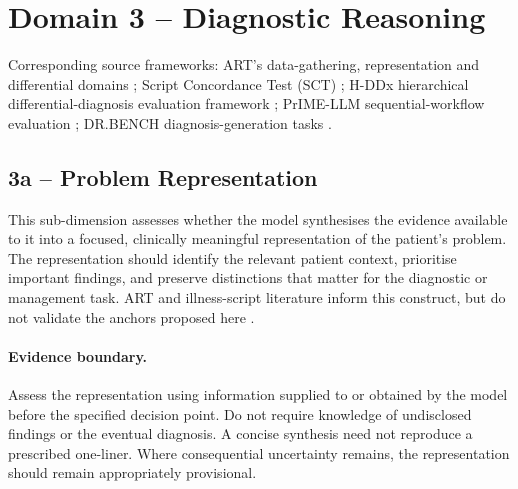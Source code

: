 \documentclass{article}
\begin{document}
\section{Domain 3 -- Diagnostic Reasoning}

Corresponding source frameworks: ART's data-gathering, representation and differential domains \cite{thammasitboon2018art}; Script Concordance Test (SCT) \cite{lubarsky2011sct,fournier2008sct}; H-DDx hierarchical differential-diagnosis evaluation framework \cite{lim2025hddx}; PrIME-LLM sequential-workflow evaluation \cite{rao2026clinicalreasoning}; DR.BENCH diagnosis-generation tasks \cite{gao2023drbench}.

\subsection{3a -- Problem Representation}

This sub-dimension assesses whether the model synthesises the
evidence available to it into a focused, clinically meaningful
representation of the patient's problem. The representation should
identify the relevant patient context, prioritise important findings,
and preserve distinctions that matter for the diagnostic or
management task. ART and illness-script literature inform this
construct, but do not validate the anchors proposed here
\cite{thammasitboon2018art,si2022illnessscripts,
jagannath2019illnessscripts}.

\paragraph{Evidence boundary.}
Assess the representation using information supplied to or obtained
by the model before the specified decision point. Do not require
knowledge of undisclosed findings or the eventual diagnosis.
A concise synthesis need not reproduce a prescribed one-liner.
Where consequential uncertainty remains, the representation should
remain appropriately provisional.
\end{document}
